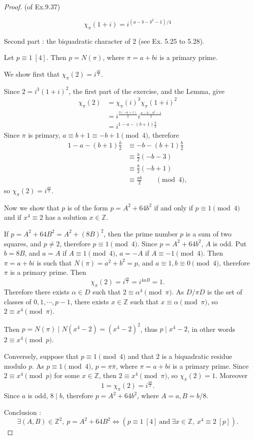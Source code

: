 \documentclass[11pt,a4paper]{article}
\newcommand{\Z}{\mathbb{Z}}
\begin{document}
\begin{proof}{(of Ex.9.37)}
\begin{enumerate}
$$\chi_\pi(1+i) = i^{(a-b-b^2-1)/4}$$

\end{enumerate}

\bigskip

Second part : the biquadratic character of 2 (see Ex. 5.25 to 5.28).

Let $p\equiv 1 \ [4]$. Then $p=N(\pi)$, where $\pi = a+bi$ is a primary prime.

We show first that $\chi_\pi(2)=i^\frac{ab}{2}$.

Since $2 = i^3(1+i)^2$, the first part of the exercise, and the Lemma, give
\begin{align*}
\chi_\pi(2) &= \chi_\pi(i)^3 \chi_\pi(1+i)^2\\
&=i^\frac{3(-a+1)}{2} i ^\frac{a-b-b^2-1}{2}\\
&=i^{1-a -(b+1)\frac{b}{2}}
\end{align*}
Since $\pi$ is primary, $a\equiv b+1 \equiv -b+1\pmod 4$, therefore
\begin{align*}
1-a -(b+1)\frac{b}{2} &\equiv - b -(b+1)\frac{b}{2}\\
&\equiv \frac{b}{2}(-b-3)\\
&\equiv \frac{b}{2}(-b+1)\\
&\equiv \frac{ab}{2} \qquad \pmod 4,
\end{align*}
so $\chi_\pi(2) = i^\frac{ab}{2} $.
 
   \bigskip
   
 Now we show that $p$ is of the form $p=A^2+64b^2$ if and only if $p\equiv 1 \pmod 4$ and if $x^4 \equiv 2$ has a solution $x \in \Z$.
 
 If $p=A^2+64B^2 = A^2 + (8B)^2$, then the prime number $p$ is a sum of two squares, and $p\ne 2$, therefore $p\equiv 1 \pmod 4$. Since $p=A^2 + 64b^2$, $A$ is odd. Put $b = 8B$, and $a = A$ if $A\equiv 1 \pmod 4$, $a = -A$ if $A\equiv -1 \pmod 4$. Then $\pi =a +bi$ is such that $N(\pi) = a^2 +b^2 = p$, and $a\equiv 1, b\equiv 0 \pmod 4$, therefore $\pi$ is a primary prime. Then
 $$\chi_\pi(2) = i^\frac{ab}{2} = i^{4aB} = 1.$$
  Therefore there exists $\alpha \in D$ such that $2\equiv \alpha^4 \pmod \pi$. As $D/\pi D$ is the set of classes of $0,1,\cdots,p-1$, there exists $x\in \Z$ such that $x\equiv \alpha \pmod \pi$, so $2 \equiv x^4 \pmod \pi$.
 
 Then $p = N(\pi) \mid N(x^4-2) = (x^4-2)^2$, thus $p \mid x^4 -2$, in other words $2\equiv x^4 \pmod p$.
   
Conversely, suppose that $p\equiv 1 \pmod 4$ and that $2$ is a biquadratic residue modulo $p$. As $p\equiv 1 \pmod 4$, $p = \pi \overline{\pi}$, where $\pi =a + bi$ is a primary prime. Since $2\equiv x^4 \pmod p$ for some $x \in \Z$, then $2 \equiv x^4 \pmod \pi$, so $\chi_\pi(2)=1$. Moreover
$$1 = \chi_\pi(2) = i^\frac{ab}{2}.$$
Since $a$ is odd, $8 \mid b$, therefore $p=A^2 + 64b^2$, where $A=a, B =b/8$.
  
 Conclusion :
 $$\exists (A,B) \in \Z^2,\ p = A^2+64B^2 \iff (p\equiv 1 \ [4] \ \mathrm{and}\ \exists x \in \Z, \ x^4 \equiv 2 \ [p]).$$
\end{proof}
\end{document}
